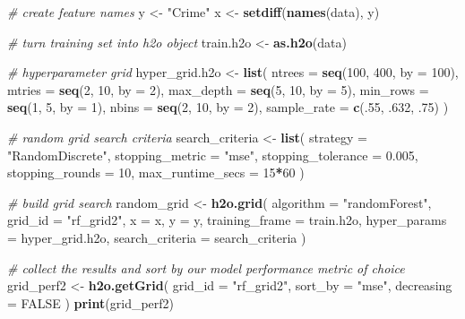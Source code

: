 \documentclass[]{article}
\newenvironment{Shaded}{\begin{snugshade}}{\end{snugshade}}
\newcommand{\KeywordTok}[1]{\textcolor[rgb]{0.13,0.29,0.53}{\textbf{#1}}}
\newcommand{\DataTypeTok}[1]{\textcolor[rgb]{0.13,0.29,0.53}{#1}}
\newcommand{\DecValTok}[1]{\textcolor[rgb]{0.00,0.00,0.81}{#1}}
\newcommand{\FloatTok}[1]{\textcolor[rgb]{0.00,0.00,0.81}{#1}}
\newcommand{\StringTok}[1]{\textcolor[rgb]{0.31,0.60,0.02}{#1}}
\newcommand{\CommentTok}[1]{\textcolor[rgb]{0.56,0.35,0.01}{\textit{#1}}}
\newcommand{\OtherTok}[1]{\textcolor[rgb]{0.56,0.35,0.01}{#1}}
\newcommand{\OperatorTok}[1]{\textcolor[rgb]{0.81,0.36,0.00}{\textbf{#1}}}
\newcommand{\NormalTok}[1]{#1}
\begin{document}
\begin{Shaded}
\begin{Highlighting}[]
\CommentTok{# create feature names}
\NormalTok{y <-}\StringTok{ "Crime"}
\NormalTok{x <-}\StringTok{ }\KeywordTok{setdiff}\NormalTok{(}\KeywordTok{names}\NormalTok{(data), y)}

\CommentTok{# turn training set into h2o object}
\NormalTok{train.h2o <-}\StringTok{ }\KeywordTok{as.h2o}\NormalTok{(data)}

\CommentTok{# hyperparameter grid}
\NormalTok{hyper_grid.h2o <-}\StringTok{ }\KeywordTok{list}\NormalTok{(}
  \DataTypeTok{ntrees      =} \KeywordTok{seq}\NormalTok{(}\DecValTok{100}\NormalTok{, }\DecValTok{400}\NormalTok{, }\DataTypeTok{by =} \DecValTok{100}\NormalTok{),}
  \DataTypeTok{mtries      =} \KeywordTok{seq}\NormalTok{(}\DecValTok{2}\NormalTok{, }\DecValTok{10}\NormalTok{, }\DataTypeTok{by =} \DecValTok{2}\NormalTok{),}
  \DataTypeTok{max_depth   =} \KeywordTok{seq}\NormalTok{(}\DecValTok{5}\NormalTok{, }\DecValTok{10}\NormalTok{, }\DataTypeTok{by =} \DecValTok{5}\NormalTok{),}
  \DataTypeTok{min_rows    =} \KeywordTok{seq}\NormalTok{(}\DecValTok{1}\NormalTok{, }\DecValTok{5}\NormalTok{, }\DataTypeTok{by =} \DecValTok{1}\NormalTok{),}
  \DataTypeTok{nbins       =} \KeywordTok{seq}\NormalTok{(}\DecValTok{2}\NormalTok{, }\DecValTok{10}\NormalTok{, }\DataTypeTok{by =} \DecValTok{2}\NormalTok{),}
  \DataTypeTok{sample_rate =} \KeywordTok{c}\NormalTok{(.}\DecValTok{55}\NormalTok{, .}\DecValTok{632}\NormalTok{, .}\DecValTok{75}\NormalTok{)}
\NormalTok{)}

\CommentTok{# random grid search criteria}
\NormalTok{search_criteria <-}\StringTok{ }\KeywordTok{list}\NormalTok{(}
  \DataTypeTok{strategy =} \StringTok{"RandomDiscrete"}\NormalTok{,}
  \DataTypeTok{stopping_metric =} \StringTok{"mse"}\NormalTok{,}
  \DataTypeTok{stopping_tolerance =} \FloatTok{0.005}\NormalTok{,}
  \DataTypeTok{stopping_rounds =} \DecValTok{10}\NormalTok{,}
  \DataTypeTok{max_runtime_secs =} \DecValTok{15}\OperatorTok{*}\DecValTok{60}
\NormalTok{  )}

\CommentTok{# build grid search }
\NormalTok{random_grid <-}\StringTok{ }\KeywordTok{h2o.grid}\NormalTok{(}
  \DataTypeTok{algorithm =} \StringTok{"randomForest"}\NormalTok{,}
  \DataTypeTok{grid_id =} \StringTok{"rf_grid2"}\NormalTok{,}
  \DataTypeTok{x =}\NormalTok{ x, }
  \DataTypeTok{y =}\NormalTok{ y, }
  \DataTypeTok{training_frame =}\NormalTok{ train.h2o,}
  \DataTypeTok{hyper_params =}\NormalTok{ hyper_grid.h2o,}
  \DataTypeTok{search_criteria =}\NormalTok{ search_criteria}
\NormalTok{  )}

\CommentTok{# collect the results and sort by our model performance metric of choice}
\NormalTok{grid_perf2 <-}\StringTok{ }\KeywordTok{h2o.getGrid}\NormalTok{(}
  \DataTypeTok{grid_id =} \StringTok{"rf_grid2"}\NormalTok{, }
  \DataTypeTok{sort_by =} \StringTok{"mse"}\NormalTok{, }
  \DataTypeTok{decreasing =} \OtherTok{FALSE}
\NormalTok{  )}
\KeywordTok{print}\NormalTok{(grid_perf2)}
\end{Highlighting}
\end{Shaded}
\end{document}

